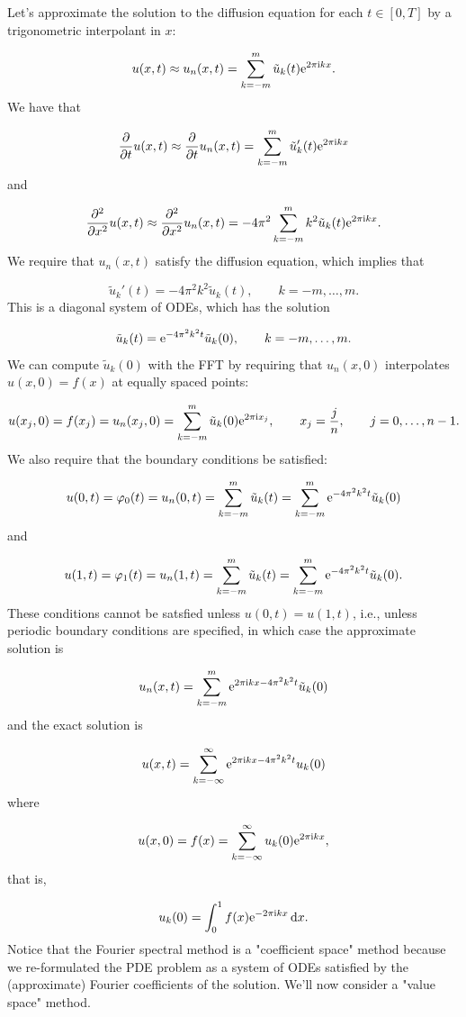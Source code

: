 \documentclass[12pt,a4paper]{article}
\begin{document}
Let's approximate the solution to the diffusion equation for each $t \in [0, T]$ by a trigonometric interpolant in $x$: 

\[
u(x,t) \approx u_n(x,t) = \sum_{k=-m}^{m} \tilde{u}_k(t) {\rm e}^{2\pi{\rm i}kx}.
\]
We have that

\[
\frac{\partial}{\partial t}u(x,t) \approx \frac{\partial}{\partial t} u_n(x,t) = \sum_{k=-m}^{m} \tilde{u}_k'(t) {\rm e}^{2\pi{\rm i}kx}
\]
and

\[
\frac{\partial^2}{\partial x^2}u(x,t) \approx \frac{\partial^2}{\partial x^2} u_n(x,t) = -4\pi^2\sum_{k=-m}^{m} k^2\tilde{u}_k(t) {\rm e}^{2\pi{\rm i}kx}.
\]
We require that $u_n(x,t)$ satisfy the diffusion equation, which implies that

\[
\tilde{u}_k'(t)  = -4\pi^2 k^2 \tilde{u}_k(t), \qquad k = -m, \ldots, m.
\]
This is a diagonal system of ODEs, which has the solution

\[
\tilde{u}_k(t) = {\rm e}^{-4\pi^2 k^2 t}\tilde{u}_k(0), \qquad k = -m, \ldots, m.
\]
We can compute $\tilde{u}_k(0)$ with the FFT by requiring that $u_n(x,0)$ interpolates $u(x,0) = f(x)$ at equally spaced points:

\[
u(x_j,0) = f(x_j) = u_n(x_j,0) = \sum_{k=-m}^{m} \tilde{u}_k(0) {\rm e}^{2\pi{\rm i}x_j}, \qquad x_j = \frac{j}{n}, \qquad j = 0, \ldots, n-1.
\]
We also require that the boundary conditions be satisfied:

\[
u(0,t) = \varphi_0(t) = u_n(0,t) = \sum_{k=-m}^{m}\tilde{u}_k(t) = \sum_{k=-m}^{m}{\rm e}^{-4\pi^2 k^2 t}\tilde{u}_k(0)
\]
and

\[
u(1,t) = \varphi_1(t) = u_n(1,t) = \sum_{k=-m}^{m}\tilde{u}_k(t) = \sum_{k=-m}^{m}{\rm e}^{-4\pi^2 k^2 t}\tilde{u}_k(0).
\]
These conditions cannot be satsfied unless $u(0,t) = u(1,t)$, i.e., unless periodic boundary conditions are specified, in which case the approximate solution is

\[
u_n(x,t) = \sum_{k=-m}^{m}  {\rm e}^{2\pi{\rm i}kx-4\pi^2 k^2 t} \tilde{u}_k(0)
\]
and the exact solution is

\[
u(x,t) = \sum_{k=-\infty}^{\infty}  {\rm e}^{2\pi{\rm i}kx-4\pi^2 k^2 t} u_k(0)
\]
where

\[
u(x,0) = f(x) = \sum_{k=-\infty}^{\infty}u_k(0) {\rm e}^{2\pi{\rm i}kx },
\]
that is,

\[
u_k(0) = \int_{0}^{1} f(x){\rm e}^{-2\pi{\rm i}kx}\,{\rm d}x.
\]
Notice that the Fourier spectral method is a "coefficient space" method because we re-formulated the PDE problem as a system of ODEs satisfied by the (approximate) Fourier coefficients of the solution.  We'll now consider a "value space" method.  
\end{document}
